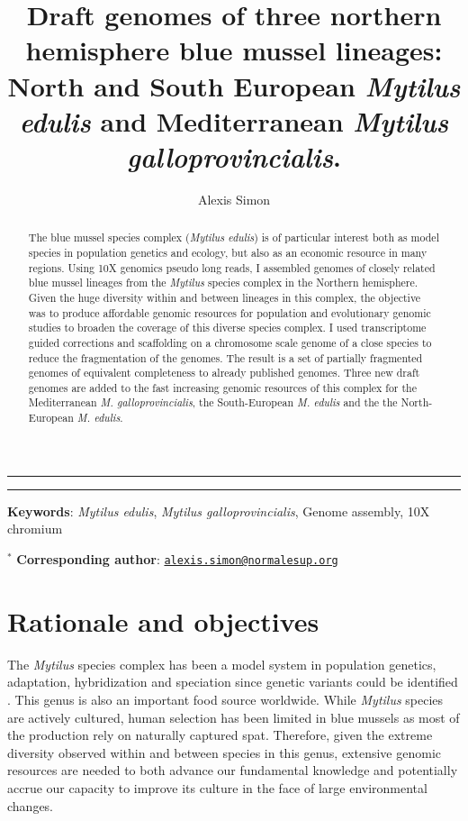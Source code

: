 \documentclass[11pt, a4paper]{article}
\title{Draft genomes of three northern hemisphere blue mussel lineages: North and South European \emph{Mytilus edulis} and Mediterranean \emph{Mytilus galloprovincialis}.}
\author[1,2,*]{Alexis Simon}
\affil[1]{ISEM, EPHE, IRD, Université Montpellier, Montpellier, France}
\affil[2]{Center of Population Biology and Department of Evolution and Ecology, University of California Davis, Davis, California, USA}
\begin{document}
\maketitle


\vspace{1cm}
\hrule
\begin{abstract}
    The blue mussel species complex (\textit{Mytilus edulis}) is of particular interest both as model species in population genetics and ecology,
    but also as an economic resource in many regions.
	Using 10X genomics pseudo long reads, I assembled genomes of closely related blue mussel lineages from the \emph{Mytilus} species complex in the Northern hemisphere.
	Given the huge diversity within and between lineages in this complex, 
	the objective was to produce affordable genomic resources for population and evolutionary genomic studies to broaden the coverage of this diverse species complex.
	I used transcriptome guided corrections and scaffolding on a chromosome scale genome of a close species to reduce the fragmentation of the genomes.
	The result is a set of partially fragmented genomes of equivalent completeness to already published genomes.
	Three new draft genomes are added to the fast increasing genomic resources of this complex for the Mediterranean \textit{M. galloprovincialis}, the South-European \textit{M. edulis} and the the North-European \textit{M. edulis}.
\end{abstract}

\vspace{3mm}
\hrule
\vspace{5mm}

\noindent
\textbf{Keywords}: \emph{Mytilus edulis}, \emph{Mytilus galloprovincialis}, Genome assembly, 10X chromium

\noindent
$^{*}$ \textbf{Corresponding author}: \href{mailto:alexis.simon@normalesup.org}{\nolinkurl{alexis.simon@normalesup.org}}

\newpage

\section{Rationale and objectives}\label{introduction}

The \textit{Mytilus} species complex has been a model system in population genetics, adaptation, hybridization and speciation since genetic variants could be identified \parencite{Milkman1970, Koehn1972, Ahmad1977, Skibinski1978, Quesada1995b, Bierne2003, Fraisse2016a, Simon2021}.
This genus is also an important food source worldwide.
While \textit{Mytilus} species are actively cultured,
human selection has been limited in blue mussels as most of the production rely on naturally captured spat.
Therefore, given the extreme diversity observed within and between species in this genus,
extensive genomic resources are needed to both advance our fundamental knowledge and potentially accrue our capacity to
improve its culture in the face of large environmental changes.
\end{document}
